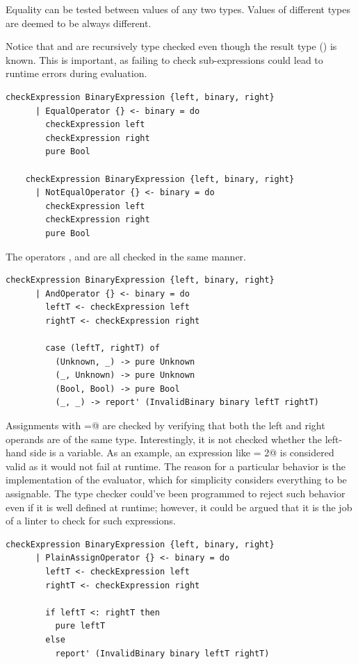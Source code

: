 \documentclass[UdineBachThesis,american,11pt]{PhdThesis}
\begin{document}
  Equality can be tested between values of any two types. Values of different
  types are deemed to be always different.

  Notice that \lstinline@left@ and \lstinline@right@ are recursively type
  checked even though the result type (\lstinline@Bool@) is known. This is
  important, as failing to check sub-expressions could lead to runtime errors
  during evaluation.

  \begin{lstlisting}[gobble=4,basicstyle=\ttfamily\small]
    checkExpression BinaryExpression {left, binary, right}
      | EqualOperator {} <- binary = do
        checkExpression left
        checkExpression right
        pure Bool

    checkExpression BinaryExpression {left, binary, right}
      | NotEqualOperator {} <- binary = do
        checkExpression left
        checkExpression right
        pure Bool
  \end{lstlisting}

  The operators \lstinline@and@, \lstinline@or@ and \lstinline@xor@ are all
  checked in the same manner.

  \begin{lstlisting}[gobble=4,basicstyle=\ttfamily\small]
    checkExpression BinaryExpression {left, binary, right}
      | AndOperator {} <- binary = do
        leftT <- checkExpression left
        rightT <- checkExpression right

        case (leftT, rightT) of
          (Unknown, _) -> pure Unknown
          (_, Unknown) -> pure Unknown
          (Bool, Bool) -> pure Bool
          (_, _) -> report' (InvalidBinary binary leftT rightT)
  \end{lstlisting}

  Assignments with \lstinline@=@ are checked by verifying that both the left and
  right operands are of the same type. Interestingly, it is not checked whether
  the left-hand side is a variable. As an example, an expression like
   = 2@ is considered valid as it would not fail at runtime. The
  reason for a particular behavior is the implementation of the evaluator, which
  for simplicity considers everything to be assignable. The type checker
  could've been programmed to reject such behavior even if it is well defined at
  runtime; however, it could be argued that it is the job of a linter to check
  for such expressions.

  \begin{lstlisting}[gobble=4,basicstyle=\ttfamily\small]
    checkExpression BinaryExpression {left, binary, right}
      | PlainAssignOperator {} <- binary = do
        leftT <- checkExpression left
        rightT <- checkExpression right

        if leftT <: rightT then
          pure leftT
        else
          report' (InvalidBinary binary leftT rightT)
  \end{lstlisting}
\end{document}

